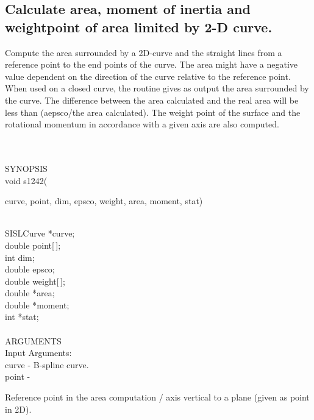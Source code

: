 \subsection{Calculate area, moment of inertia and weightpoint of area limited by 2-D curve.}
\begin{minipg1}
Compute the area surrounded by a 2D-curve and the straight lines from a reference
point to the end points of the curve. The area might have a negative value
dependent on the direction of the curve relative to the reference point. When
used on a closed curve, the routine gives as output the area surrounded by the curve.
The difference between the area calculated and the real area will be less than
(aepsco/the area calculated). The weight point of the surface and the rotational
momentum in accordance with a given axis are also computed.
\end{minipg1} \\ \\
SYNOPSIS\\
        \>void s1242(\begin{minipg3}
        {\fov curve}, {\fov point}, {\fov dim}, {\fov epsco}, {\fov weight}, {\fov area}, {\fov moment}, {\fov stat})
                \end{minipg3}\\[0.3ex]
                \>\>    SISLCurve       \>      *{\fov curve};\\
                \>\>    double  \>      {\fov point}[\,];\\
                \>\>    int     \>      {\fov dim};\\
                \>\>    double  \>      {\fov epsco};\\
                \>\>    double  \>      {\fov weight}[\,];\\
                \>\>    double  \>      *{\fov area};\\
                \>\>    double  \>      *{\fov moment};\\
                \>\>    int     \>      *{\fov stat};\\
\\
ARGUMENTS\\
        \>Input Arguments:\\
        \>\>    {\fov curve}    \> - \> B-spline curve.\\
        \>\>    {\fov point}    \> - \>\begin{minipg2}
                                Reference point in the area computation / axis vertical
                                to a plane (given as point in 2D).
                                \end{minipg2}\\
